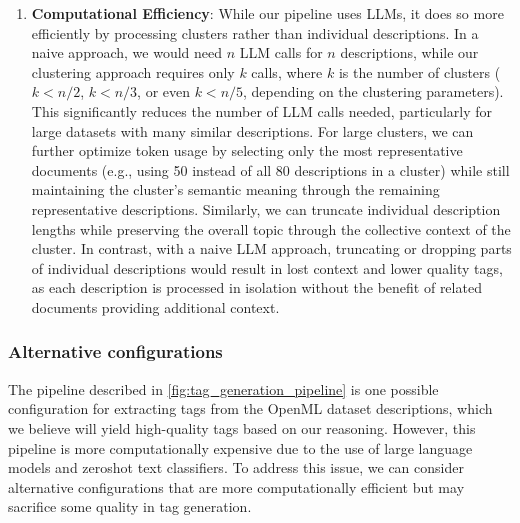 \begin{enumerate}
    \item \textbf{Computational Efficiency}: While our pipeline uses LLMs, it does so more efficiently by processing clusters rather than individual descriptions. In a naive approach, we would need $n$ LLM calls for $n$ descriptions, while our clustering approach requires only $k$ calls, where $k$ is the number of clusters ($k < n/2$, $k < n/3$, or even $k < n / 5$, depending on the clustering parameters). This significantly reduces the number of LLM calls needed, particularly for large datasets with many similar descriptions. For large clusters, we can further optimize token usage by selecting only the most representative documents (e.g., using 50 instead of all 80 descriptions in a cluster) while still maintaining the cluster's semantic meaning through the remaining representative descriptions. Similarly, we can truncate individual description lengths while preserving the overall topic through the collective context of the cluster. In contrast, with a naive LLM approach, truncating or dropping parts of individual descriptions would result in lost context and lower quality tags, as each description is processed in isolation without the benefit of related documents providing additional context.

\end{enumerate}

\subsubsection{Alternative configurations}
\label{sec:alternative_configurations}
The pipeline described in \cref{fig:tag_generation_pipeline} is one possible configuration for extracting tags from the OpenML dataset descriptions, which we believe will yield high-quality tags based on our reasoning. However, this pipeline is more computationally expensive due to the use of large language models and zeroshot text classifiers. To address this issue, we can consider alternative configurations that are more computationally efficient but may sacrifice some quality in tag generation.

